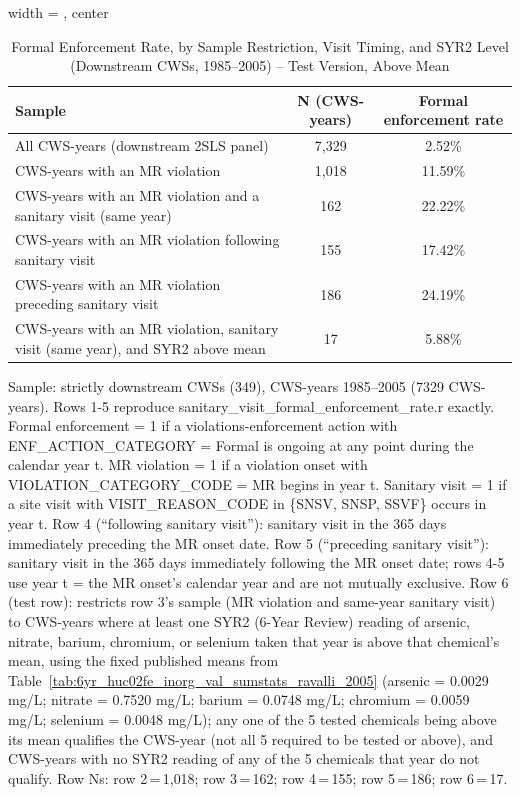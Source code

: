 \begin{table}[htbp]
\caption{\label{tab:sanitary_visit_formal_enforcement_rate_syr2_above_mean} Formal Enforcement Rate, by Sample Restriction, Visit Timing, and SYR2 Level (Downstream CWSs, 1985--2005) -- Test Version, Above Mean}
\bigskip
\centering
\begin{adjustbox}{width = \textwidth, center}
\begin{tabular}{lcc}
\toprule
Sample & N (CWS-years) & Formal enforcement rate \\
\midrule
All CWS-years (downstream 2SLS panel) & 7{,}329 & 2.52\% \\
CWS-years with an MR violation & 1{,}018 & 11.59\% \\
CWS-years with an MR violation and a sanitary visit (same year) & 162 & 22.22\% \\
CWS-years with an MR violation following sanitary visit & 155 & 17.42\% \\
CWS-years with an MR violation preceding sanitary visit & 186 & 24.19\% \\
CWS-years with an MR violation, sanitary visit (same year), and SYR2 above mean & 17 & 5.88\% \\
\bottomrule
\end{tabular}
\end{adjustbox}
{\tiny\linespread{1}\selectfont \par \raggedright 
Sample: strictly downstream CWSs (349), CWS-years 1985--2005 (7329 CWS-years). Rows 1-5 reproduce sanitary\_visit\_formal\_enforcement\_rate.r exactly. Formal enforcement = 1 if a violations-enforcement action with ENF\_ACTION\_CATEGORY = Formal is ongoing at any point during the calendar year t. MR violation = 1 if a violation onset with VIOLATION\_CATEGORY\_CODE = MR begins in year t. Sanitary visit = 1 if a site visit with VISIT\_REASON\_CODE in \{SNSV, SNSP, SSVF\} occurs in year t. Row 4 (``following sanitary visit''): sanitary visit in the 365 days immediately preceding the MR onset date. Row 5 (``preceding sanitary visit''): sanitary visit in the 365 days immediately following the MR onset date; rows 4-5 use year t = the MR onset's calendar year and are not mutually exclusive. Row 6 (test row): restricts row 3's sample (MR violation and same-year sanitary visit) to CWS-years where at least one SYR2 (6-Year Review) reading of arsenic, nitrate, barium, chromium, or selenium taken that year is above that chemical's mean, using the fixed published means from Table~\ref{tab:6yr_huc02fe_inorg_val_sumstats_ravalli_2005} (arsenic = 0.0029 mg/L; nitrate = 0.7520 mg/L; barium = 0.0748 mg/L; chromium = 0.0059 mg/L; selenium = 0.0048 mg/L); any one of the 5 tested chemicals being above its mean qualifies the CWS-year (not all 5 required to be tested or above), and CWS-years with no SYR2 reading of any of the 5 chemicals that year do not qualify. Row Ns: row 2\,=\,1{,}018; row 3\,=\,162; row 4\,=\,155; row 5\,=\,186; row 6\,=\,17.
}
\end{table}
